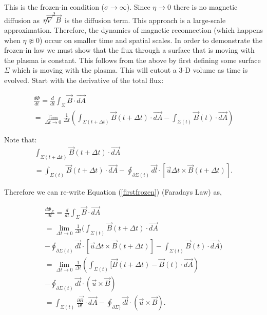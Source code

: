 \documentclass[%
 reprint,
 amsmath,amssymb,
 aps,
]{revtex4-1}
\begin{document}
This is the frozen-in condition ($\sigma \to \infty$). Since $\eta \to 0$ there is no magnetic diffusion as \,$\eta \vec{\nabla} ^2 \vec{B}$\, is the diffusion term. This approach is a large-scale approximation. Therefore, the dynamics of magnetic reconnection (which happens when $\eta \napprox 0 $) occur on smaller time and spatial scales. In order to demonstrate the frozen-in law we must show that the flux through a surface that is moving with the plasma is constant. This follows from the above by first defining some surface $\Sigma$ which is moving with the plasma. This will cutout a 3-D volume as time is evolved. Start with the derivative of the total flux:

\begin{equation}\label{firstfrozen}
\begin{multlined}
\frac{d \Phi}{dt} = \frac{d}{dt} \int_{\Sigma} \vec{B} \cdot \vec{dA} 
\\ = \lim_{\Delta t \to 0} \frac{1}{\Delta t} \left( \int_{\Sigma (t + \Delta t)} \vec{B} (t + \Delta t) \cdot \vec{dA} - \int_{\Sigma (t)} \vec{B} (t) \cdot \vec{dA}  \right)
\end{multlined}
\end{equation}

Note that:
\begin{equation}
\begin{multlined}
\int_{\Sigma (t + \Delta t)} \vec{B} (t + \Delta t) \cdot \vec{dA} 
\\ =  \int_{\Sigma(t)} \vec{B} ( t + \Delta t) \cdot \vec{dA} -
\oint _{\partial \Sigma(t)} \vec{dl} \cdot [ \vec{u} \Delta t \times \vec{B}(t + \Delta t) ].
\end{multlined}
\end{equation}

Therefore we can re-write Equation (\ref{firstfrozen}) (Faradays Law) as,

\begin{equation}
\begin{multlined}
\frac{d \Phi_{\Sigma}}{d t} = \frac{d}{dt} \int_{\Sigma} \vec{B} \cdot \vec{dA} 
\\ = \lim_{\Delta t \to 0} \frac{1}{\Delta t} \biggl( \int_{\Sigma(t)} \vec{B} ( t + \Delta t) \cdot \vec{dA}
\\ - \oint _{\partial \Sigma(t)} \vec{dl} \cdot [ \vec{u} \Delta t \times \vec{B}(t + \Delta t) ] - \int_{\Sigma (t)} \vec{B} (t) \cdot \vec{dA}  \biggr)
\\ = \lim_{\Delta t \to 0} \frac{1}{\Delta t} \left( \int_{\Sigma(t)} [\vec{B} (t + \Delta t) - \vec{B} (t)  \cdot \vec{dA} \right) 
\\- \oint _{\partial \Sigma(t)} \vec{dl} \cdot (\vec{u} \times \vec{B})
\\= \int_{\Sigma (t)} \frac{\partial \vec{B}}{\partial t} \cdot \vec{dA} - \oint _{\partial \Sigma)} \vec{dl} \cdot (\vec{u} \times \vec{B}).
\end{multlined}
\end{equation}
\end{document}
